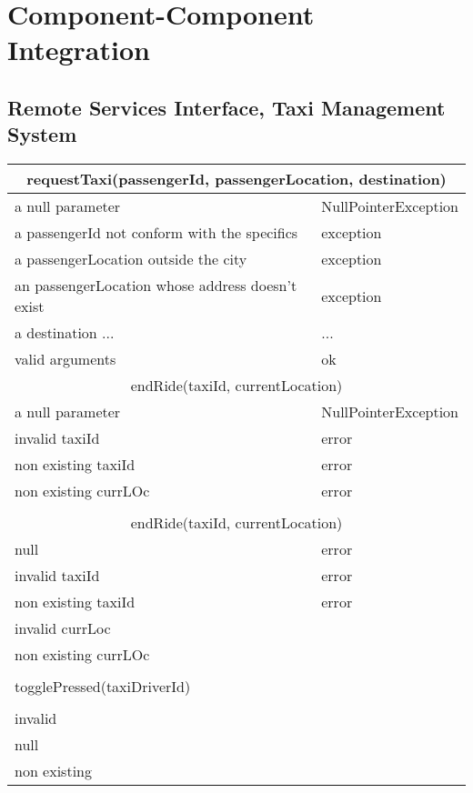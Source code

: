 \documentclass[11pt,oneside,a4paper]{report}
\begin{document}
\chapter{Component-Component Integration}
\section{Remote Services Interface, Taxi Management System}
\begin{tabular}{p{5cm}|p{6cm}}
	\hline
	\multicolumn{2}{c}{requestTaxi(passengerId, passengerLocation, destination)}\\\hline
	a null parameter &
	NullPointerException \\\hline
	a passengerId not conform with the specifics &
	exception\\\hline
	a passengerLocation outside the city &
	exception\\\hline
	an passengerLocation whose address doesn't exist &
	exception \\\hline
	a destination ... &
	... \\\hline
	valid arguments &
	ok\\\hline\hline
	
	\multicolumn{2}{c}{endRide(taxiId, currentLocation)}\\\hline
	a null parameter &
	NullPointerException \\\hline
		invalid taxiId &
	error \\\hline
	
		non existing taxiId &
	error \\\hline

				non existing currLOc &
	error \\\hline\\\hline

\multicolumn{2}{c}{endRide(taxiId, currentLocation)}\\\hline
	null &
	error \\\hline
	
				invalid taxiId &
		error \\\hline
		
						non existing taxiId &
			error \\\hline

	invalid currLoc\\\hline
	non existing currLOc\\\hline\\\hline
	 togglePressed(taxiDriverId)\\\hline\\
	invalid\\\hline
	null\\\hline
	non existing\\\hline
	
\end{tabular}
\end{document}
